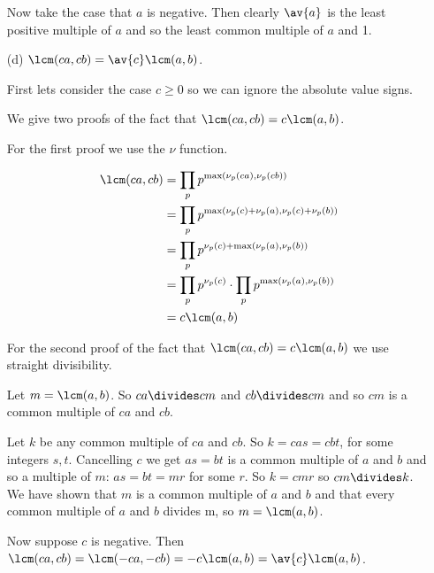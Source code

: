 \documentclass[oneside,12pt]{amsart}
\begin{document}
\begin{enumerate}
\begin{subproof}
Now take the case that $a$ is negative. Then clearly $\av{a}$ is the least positive
multiple of $a$ and so the least common multiple of $a$ and 1.
\end{subproof}

\item[(d)] $\lcm(ca,cb) = \av{c}\lcm(a,b)$.
\begin{subproof}
First lets consider the case $c\geq 0$ so we can ignore the absolute value signs.

We give two proofs of the fact that $\lcm(ca,cb) = c\lcm(a,b)$.

For the first proof we use the $\nu$ function.

\begin{align*}
\lcm(ca,cb)  &=  \prod_p p^{\max\left(\nu_p(ca),\nu_p(cb)\right)} \\
             &=  \prod_p p^{\max\left(\nu_p(c)+\nu_p(a),\nu_p(c) + \nu_p(b)\right)} \\
             &=  \prod_p p^{\nu_p(c) + \max(\nu_p(a),\nu_p(b))} \\
             &=  \prod_p p^{\nu_p(c)} \cdot \prod_p p^{\max(\nu_p(a),\nu_p(b))}\\
             &=  c \lcm(a,b) \\
\end{align*}

For the second proof of the fact that $\lcm(ca,cb) = c\lcm(a,b)$ we use straight divisibility.

Let $m=\lcm(a,b)$. So $ca\divides cm$ and $cb\divides cm$ and so $cm$ is a common multiple of $ca$ and $cb$.

Let $k$ be any common multiple of $ca$ and $cb$. So $k=cas=cbt$, for some integers $s,t$. 
Cancelling $c$ we get $as=bt$ is a common multiple of $a$ and $b$ and so a multiple of $m$: $as=bt=mr$
for some $r$. So $k=cmr$ so $cm\divides k$. We have shown that $m$ is a common multiple of $a$ and $b$ and that every common multiple of 
$a$ and $b$ divides m, so $m=\lcm(a,b)$.

Now suppose $c$ is negative. Then $\lcm(ca,cb) = \lcm(-ca,-cb) = -c \lcm(a,b) = \av{c} \lcm(a,b)$.
\end{subproof}

\end{enumerate}


\bigskip
\end{document}
